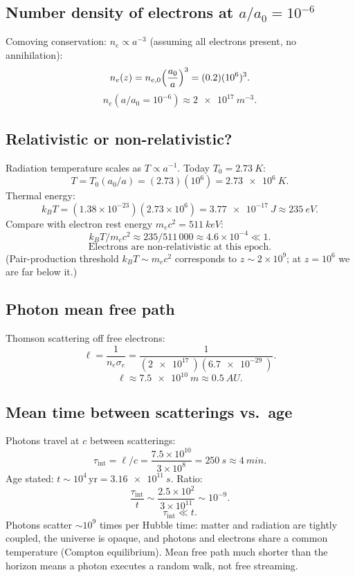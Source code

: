 \documentclass[11pt]{article}
\begin{document}
\subsection*{Number density of electrons at $a/a_{0}=10^{-6}$}

Comoving conservation: $n_{e}\propto a^{-3}$ (assuming all electrons present, no annihilation):
\[ n_{e}(z) = n_{e,0}\Bigl(\frac{a_{0}}{a}\Bigr)^{3} = (0.2)(10^{6})^{3}. \]
\[ \boxed{\;n_{e}(a/a_{0}=10^{-6}) \approx \SI{2e17}{m^{-3}}.\;} \]

\subsection*{Relativistic or non-relativistic?}

Radiation temperature scales as $T\propto a^{-1}$. Today $T_{0}=\SI{2.73}{K}$:
\[ T = T_{0}(a_{0}/a) = (2.73)(10^{6}) = \SI{2.73e6}{K}. \]
Thermal energy:
\[ k_{B}T = (1.38\times 10^{-23})(2.73\times 10^{6}) = \SI{3.77e-17}{J}\approx \SI{235}{eV}. \]
Compare with electron rest energy $m_{e}c^{2}=\SI{511}{keV}$:
\[ k_{B}T / m_{e}c^{2} \approx 235/511\,000 \approx 4.6\times 10^{-4}\ll 1. \]
\[ \boxed{\;\text{Electrons are non-relativistic at this epoch.}\;} \]
(Pair-production threshold $k_{B}T\sim m_{e}c^{2}$ corresponds to $z\sim 2\times 10^{9}$; at $z=10^{6}$ we are far below it.)

\subsection*{Photon mean free path}

Thomson scattering off free electrons:
\[ \ell = \frac{1}{n_{e}\sigma_{e}} = \frac{1}{(\SI{2e17}{})(\SI{6.7e-29}{})}. \]
\[ \boxed{\;\ell \approx \SI{7.5e10}{m}\approx \SI{0.5}{AU}.\;} \]

\subsection*{Mean time between scatterings vs.\ age}

Photons travel at $c$ between scatterings:
\[ \tau_{\text{int}} = \ell/c = \frac{7.5\times 10^{10}}{3\times 10^{8}} = \SI{250}{s}\approx \SI{4}{min}. \]
Age stated: $t\sim 10^{4}\,\text{yr}=\SI{3.16e11}{s}$. Ratio:
\[ \frac{\tau_{\text{int}}}{t} \sim \frac{2.5\times 10^{2}}{3\times 10^{11}} \sim 10^{-9}. \]
\[ \boxed{\;\tau_{\text{int}}\ll t.\;} \]
Photons scatter $\sim 10^{9}$ times per Hubble time: matter and radiation are tightly coupled, the universe is opaque, and photons and electrons share a common temperature (Compton equilibrium). Mean free path much shorter than the horizon means a photon executes a random walk, not free streaming.
\end{document}
